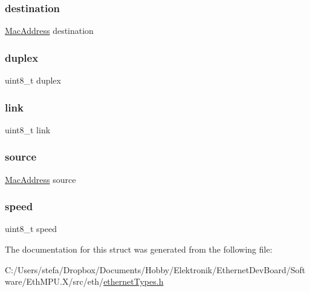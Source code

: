 \subsubsection{\texorpdfstring{destination}{destination}}
{\footnotesize\ttfamily \mbox{\hyperlink{ethernet_types_8h_ae4e06476597d217d540a5e2b2d699649}{Mac\+Address}} destination}

\mbox{\label{structethernet_connection__t_a9296ce83c568e13e59d7c33283886601}} 
\subsubsection{\texorpdfstring{duplex}{duplex}}
{\footnotesize\ttfamily uint8\+\_\+t duplex}

\mbox{\label{structethernet_connection__t_a1c7dfe6bdcd6993494b6e94993ef5607}} 
\subsubsection{\texorpdfstring{link}{link}}
{\footnotesize\ttfamily uint8\+\_\+t link}

\mbox{\label{structethernet_connection__t_ad921b9c440e49b18b551c1c6bda03dcc}} 
\subsubsection{\texorpdfstring{source}{source}}
{\footnotesize\ttfamily \mbox{\hyperlink{ethernet_types_8h_ae4e06476597d217d540a5e2b2d699649}{Mac\+Address}} source}

\mbox{\label{structethernet_connection__t_aae32029df16a54aa86c0aec2df9f7bb7}} 
\subsubsection{\texorpdfstring{speed}{speed}}
{\footnotesize\ttfamily uint8\+\_\+t speed}



The documentation for this struct was generated from the following file\+:\begin{DoxyCompactItemize}
\item 
C\+:/\+Users/stefa/\+Dropbox/\+Documents/\+Hobby/\+Elektronik/\+Ethernet\+Dev\+Board/\+Software/\+Eth\+M\+P\+U.\+X/src/eth/\mbox{\hyperlink{ethernet_types_8h}{ethernet\+Types.\+h}}\end{DoxyCompactItemize}
